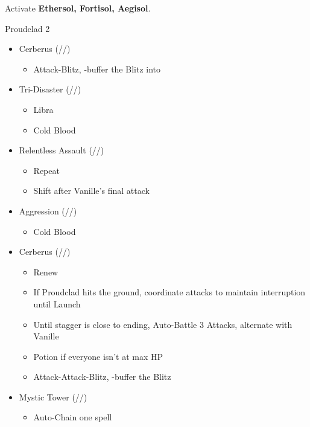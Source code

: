 Activate \textbf{Ethersol, Fortisol, Aegisol}.
\vfill
\renewcommand{\first}{[1] Aggression (\rav/\com/\com)}
\renewcommand{\second}{[2] Cerberus (\com/\com/\com)}
\renewcommand{\third}{[3] Mystic Tower (\rav/\sen/\rav)}
\renewcommand{\fourth}{[4] Solidarity (\com/\sen/\med)}
\renewcommand{\fifth}{[5] Relentless Assault (\rav/\com/\rav)}
\renewcommand{\sixth}{[6] Tri-Disaster (\rav/\rav/\rav)}
\begin{battle}[2:01]{Proudclad 2}
		\begin{itemize}
			\item \second
			      \begin{itemize}
				      \item Attack-Blitz, \rav-buffer the Blitz into
			      \end{itemize}
			\item \sixth
			      \begin{itemize}
				      \item Libra
				      \item Cold Blood
			      \end{itemize}
			\item \fifth
			      \begin{itemize}
				      \item Repeat
				      \item Shift after Vanille's final attack
			      \end{itemize}
			\item \first
			      \begin{itemize}
				      \item Cold Blood
			      \end{itemize}
			\item \second
			      \begin{itemize}
				      \item Renew
				      \item If Proudclad hits the ground, coordinate attacks to maintain interruption until Launch
				      \item Until stagger is close to ending, Auto-Battle 3 Attacks, alternate with Vanille
				      \item Potion if everyone isn't at max HP
				      \item Attack-Attack-Blitz, \rav-buffer the Blitz
			      \end{itemize}
			\item \third
			      \begin{itemize}
				      \item Auto-Chain one spell

\end{itemize}
\end{itemize}
\end{battle}
